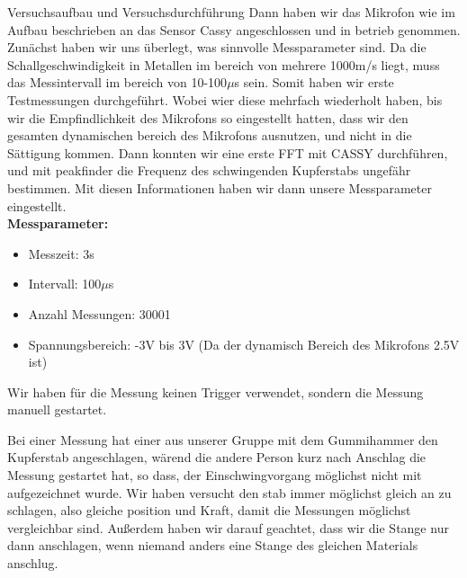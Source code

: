 \documentclass[twoside]{protokoll}
\begin{document}
\begin{aufgabe}{Versuchsaufbau und Versuchsdurchführung}
Dann haben wir das Mikrofon wie im Aufbau beschrieben an das Sensor Cassy angeschlossen und in betrieb genommen. Zunächst haben wir uns überlegt, was sinnvolle Messparameter sind. Da die Schallgeschwindigkeit in Metallen im bereich von mehrere 1000m/s liegt, muss das Messintervall im bereich von 10-100$\mu$s sein. Somit haben wir erste Testmessungen durchgeführt. Wobei wier diese mehrfach wiederholt haben, bis wir die Empfindlichkeit des Mikrofons so eingestellt hatten, dass wir den gesamten dynamischen bereich des Mikrofons ausnutzen, und nicht in die Sättigung kommen. Dann konnten wir eine erste FFT mit CASSY durchführen, und mit peakfinder die Frequenz des schwingenden Kupferstabs ungefähr bestimmen. Mit diesen Informationen haben wir dann unsere Messparameter eingestellt.\\

\textbf{Messparameter:}
\begin{itemize}
\item Messzeit: 3s
\item Intervall: 100$\mu$s
\item Anzahl Messungen: 30001
\item Spannungsbereich: -3V bis 3V (Da der dynamisch Bereich des Mikrofons 2.5V ist)
\end{itemize}

Wir haben für die Messung keinen Trigger verwendet, sondern die Messung manuell gestartet. 


Bei einer Messung hat einer aus unserer Gruppe mit dem Gummihammer den Kupferstab angeschlagen, wärend die andere Person kurz nach Anschlag die Messung gestartet hat, so dass, der Einschwingvorgang möglichst nicht mit aufgezeichnet wurde. Wir haben versucht den stab immer möglichst gleich an zu schlagen, also gleiche position und Kraft, damit die Messungen möglichst vergleichbar sind. Außerdem haben wir darauf geachtet, dass wir die Stange nur dann anschlagen, wenn niemand anders eine Stange des gleichen Materials anschlug.


\end{aufgabe}
\end{document}
